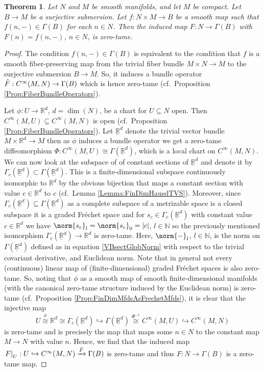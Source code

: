\documentclass[12pt,a4paper]{article}
\theoremstyle{plain}
\newtheorem{theorem}{Theorem}[subsection]
\theoremstyle{definition}
\newcommand{\R}{\mathbb{R}}
\newcommand{\N}{\mathbb{N}}
\newcommand{\nnorm}[2]{\norm{#1}_{#2}}
\begin{document}
\begin{theorem}
\label{Theorem:FamiliesOfFBSections}
Let $N$ and $M$ be smooth manifolds, and let $M$ be compact. Let $B\to M$ be a surjective submersion. Let $f:N\times M\to B$ be a smooth map such that $f(n,-)\in \Gamma(B)$ for each $n\in N$. Then the induced map $F:N\to \Gamma(B)$ with $F(n)=f(n,-)$, $n\in N$, is zero-tame.
\end{theorem}
\begin{proof}
The condition $f(n,-)\in \Gamma(B)$ is equivalent to the condition that $f$ is a smooth fiber-preserving map from the trivial fiber bundle $M\times N\to M$ to the surjective submersion $B\to M$. So, it induces a bundle operator $\Tilde{F}:C^\infty(M,N)\to \Gamma(B)$ which is hence zero-tame (cf.~Proposition \ref{Prop:FiberBundleOperators}).

Let $\phi:U\to \R^d$, $d=\dim(N)$, be a chart for $U\subseteq N$ open. Then $C^\infty(M,U)\subseteq C^\infty(M,N)$ is open (cf.~Proposition \ref{Prop:FiberBundleOperators}). Let $\underline{\R}^d$ denote the trivial vector bundle $M\times \R^d \to M$ then as $\phi$ induces a bundle operator we get a zero-tame diffeomorphism $\Phi:C^\infty(M,U)\cong \Gamma(\underline{\R}^d)$, which is a local chart on $C^\infty(M,N)$. 
We can now look at the subspace of of constant sections of $\underline{\R}^d$ and denote it by $\Gamma_c(\underline{\R}^d) \subset \Gamma(\underline{\R}^d)$. This is a finite-dimensional subspace continuously isomorphic to $\R^d$ by the obvious bijection that maps a constant section with value $c\in \R^d$ to $c$ (cf.~Lemma \ref{Lemma:FinDimHausdTVS}). Moreover, since $\Gamma_c(\underline{\R}^d)\subseteq \Gamma(\underline{\R}^d)$ as a complete subspace of a metrizable space is a closed subspace it is a graded Fréchet space and for $s_c\in \Gamma_c(\underline{\R}^d)$ with constant value $c\in \R^d$ we have $\nnorm{s_c}{l}=\nnorm{s_c}{0}=|c|$, $l\in \N$ so the previously mentioned isomorphism $\Gamma_c(\underline{\R}^d)\to \R^d$ is zero-tame. Here, $\nnorm{-}{l}$, $l\in \N$, is the norm on $\Gamma(\underline{\R}^d)$ defined as in equation \eqref{VBsectGlobNorm} with respect to the trivial covariant derivative, and Euclidean norm. Note that in general not every (continuous) linear map of (finite-dimensional) graded Fréchet spaces is also zero-tame. So, noting that $\phi$ as a smooth map of smooth finite-dimensional manifolds (with the canonical zero-tame structure induced by the Euclidean norm) is zero-tame (cf.~Proposition \ref{Prop:FinDimMfdsAsFrechetMfds}), it is clear that the injective map $$U\stackrel{\phi}{\cong} \R^d \cong \Gamma_c(\underline{\R}^d)\hookrightarrow \Gamma(\underline{\R}^d)\stackrel{\Phi^{-1}}{\cong} C^\infty(M,U)\hookrightarrow C^\infty(M,N)$$ is zero-tame and is precisely the map that maps some $n\in N$ to the constant map $M\to N$ with value $n$. Hence, we find that the induced map $\left.F\right|_U:U\hookrightarrow C^\infty(M,N)\xrightarrow{\Tilde{F}} \Gamma(B)$ is zero-tame and thus $F:N\to \Gamma(B)$ is a zero-tame map. 
\end{proof}
\end{document}
